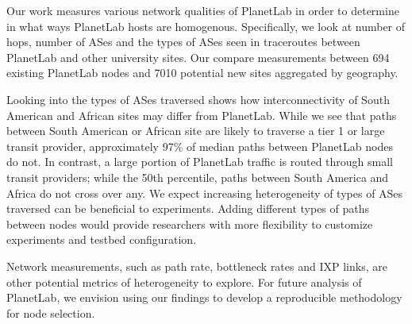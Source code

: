 \documentclass{sig-alternate-10pt}
\begin{document}
Our work measures various network qualities of PlanetLab in order to determine in 
what ways PlanetLab hosts are homogenous. Specifically, we look at number of hops,
number of ASes and the types of ASes seen in traceroutes between PlanetLab and other 
university sites. Our compare measurements between 694 existing PlanetLab nodes and 
7010 potential new sites aggregated by geography.

Looking into the types of ASes traversed shows how interconnectivity of South 
American and African sites may differ from PlanetLab. While we see that paths between 
South American or African site are likely to traverse a tier 1 or large transit 
provider, approximately 97\% of median paths between PlanetLab nodes do not. In 
contrast, a large portion of PlanetLab traffic is routed through small transit 
providers; while the 50th percentile, paths between South America and Africa do not 
cross over any. We expect increasing heterogeneity of types of ASes traversed can be 
beneficial to experiments. Adding different types of paths between nodes would provide
researchers with more flexibility to customize experiments and testbed configuration.  

Network measurements, such as path rate, bottleneck rates and IXP links, are other 
potential metrics of heterogeneity to explore. For future analysis of PlanetLab, we 
envision using our findings to develop a reproducible methodology for node selection. 



\end{document}
